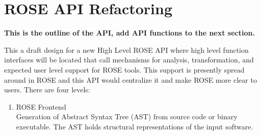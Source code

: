 \section{ROSE API Refactoring}

{\bf This is the outline of the API, add API functions to the next section.}

This a draft design for a new High Level ROSE API where high level function interfaces will be
located that call mechanisms for analysis, transformation, and expected user level support
for ROSE tools. This support is presently spread around in ROSE and this API would
centralize it and make ROSE more clear to users.
There are four levels:
\begin{enumerate}
   \item ROSE Frontend \\
      Generation of Abstract Syntax Tree (AST) from source code or binary executable.
      The AST holds structural representations of the input software.


\end{enumerate}
